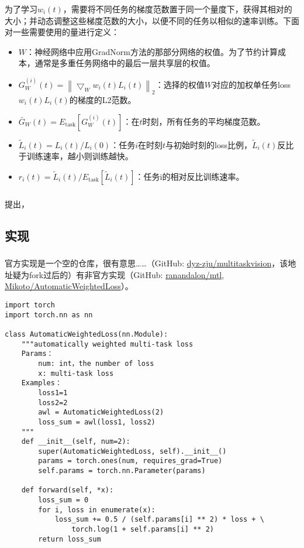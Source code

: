 \documentclass{ctexart}
\begin{document}
为了学习$w_i(t)$，需要将不同任务的梯度范数置于同一个量度下，获得其相对的大小；并动态调整这些梯度范数的大小，以便不同的任务以相似的速率训练。下面对一些需要使用的量进行定义：
\begin{itemize}
    \item $W$：神经网络中应用GradNorm方法的那部分网络的权值。为了节约计算成本，通常是多重任务网络中的最后一层共享层的权值。
    \item $G_{W}^{(i)}(t) =\left \| \bigtriangledown_{W}w_{i}(t)L_{i}(t) \right \|_{2}$：选择的权值$W$对应的加权单任务loss\ $w_{i}(t)L_{i}(t)$的梯度的L2范数。
    \item $\bar{G}_{W}(t)=E_\mathrm{task}[G_{W}^{(i)}(t)]$：在$t$时刻，所有任务的平均梯度范数。
    \item $\tilde{L}_{i}(t)={L_{i}(t)}/{L_{i}(0)}$：任务$i$在时刻$t$与初始时刻的loss比例，$\tilde{L}_{i}(t)$反比于训练速率，越小则训练越快。 %
    \item $r_{i}(t)=\tilde{L}_{i}(t)/E_\mathrm{task}[\tilde{L}_{i}(t)]$：任务i的相对反比训练速率。
\end{itemize}

\mapsto 

\subsubsection{}

\citet{Sener18Pareto}提出，

\subsection{实现}

\subsubsection{}

官方实现是一个空的仓库，很有意思……（GitHub: \href{https://github.com/dyz-zju/multitaskvision}{dyz-zju/multitaskvision}，该地址疑为fork过后的）有非官方实现（GitHub: \href{https://github.com/ranandalon/mtl}{ranandalon/mtl}, \href{https://github.com/Mikoto10032/AutomaticWeightedLoss}{Mikoto/Automatic\-Weighted\-Loss}）。

\begin{verbatim}
import torch
import torch.nn as nn

class AutomaticWeightedLoss(nn.Module):
    """automatically weighted multi-task loss
    Params：
        num: int，the number of loss
        x: multi-task loss
    Examples：
        loss1=1
        loss2=2
        awl = AutomaticWeightedLoss(2)
        loss_sum = awl(loss1, loss2)
    """
    def __init__(self, num=2):
        super(AutomaticWeightedLoss, self).__init__()
        params = torch.ones(num, requires_grad=True)
        self.params = torch.nn.Parameter(params)

    def forward(self, *x):
        loss_sum = 0
        for i, loss in enumerate(x):
            loss_sum += 0.5 / (self.params[i] ** 2) * loss + \
                torch.log(1 + self.params[i] ** 2)
        return loss_sum
\end{verbatim}
\end{document}
